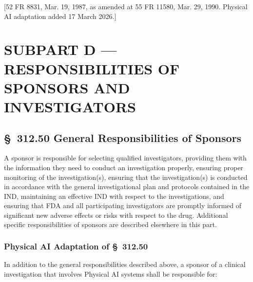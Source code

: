 [52 FR 8831, Mar. 19, 1987, as amended at 55 FR 11580, Mar. 29, 1990. Physical AI adaptation added 17 March 2026.]

\clearpage

\section{SUBPART D --- RESPONSIBILITIES OF SPONSORS AND INVESTIGATORS}

\subsection{\S~312.50 General Responsibilities of Sponsors}

A sponsor is responsible for selecting qualified investigators, providing them with the information they need to conduct an investigation properly, ensuring proper monitoring of the investigation(s), ensuring that the investigation(s) is conducted in accordance with the general investigational plan and protocols contained in the IND, maintaining an effective IND with respect to the investigations, and ensuring that FDA and all participating investigators are promptly informed of significant new adverse effects or risks with respect to the drug. Additional specific responsibilities of sponsors are described elsewhere in this part.

\subsubsection{Physical AI Adaptation of \S~312.50}

In addition to the general responsibilities described above, a sponsor of a clinical investigation that involves Physical AI systems shall be responsible for:

